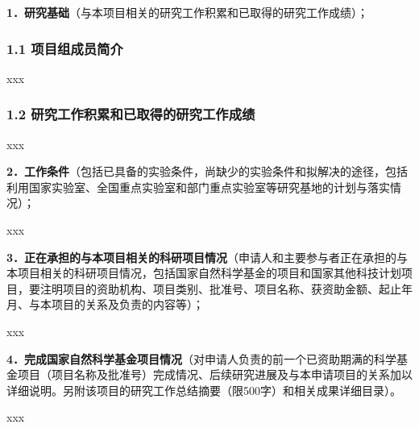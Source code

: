 
{\sihao \kaishu \color{MsBlue}
	\textbf{1．研究基础}（与本项目相关的研究工作积累和已取得的研究工作成绩）；
}


\subsubsection{1.1 项目组成员简介}

{\kaishu
	
	xxx
}

\vspace{0.3cm}

\subsubsection{1.2 研究工作积累和已取得的研究工作成绩}

\vspace{0.3cm}
{\kaishu
	xxx
}

{\sihao \kaishu \color{MsBlue}
	\textbf{2．工作条件}（包括已具备的实验条件，尚缺少的实验条件和拟解决的途径，包括利用国家实验室、全国重点实验室和部门重点实验室等研究基地的计划与落实情况）；
}

{\kaishu
	xxx
}


\vspace{0.3cm}

{\sihao \kaishu \color{MsBlue}
	\textbf{3．正在承担的与本项目相关的科研项目情况}（申请人和主要参与者正在承担的与本项目相关的科研项目情况，包括国家自然科学基金的项目和国家其他科技计划项目，要注明项目的资助机构、项目类别、批准号、项目名称、获资助金额、起止年月、与本项目的关系及负责的内容等）；
}

{\kaishu
	xxx
}

\vspace{0.3cm}

{\sihao \kaishu \color{MsBlue}
	\textbf{4．完成国家自然科学基金项目情况}（对申请人负责的前一个已资助期满的科学基金项目（项目名称及批准号）完成情况、后续研究进展及与本申请项目的关系加以详细说明。另附该项目的研究工作总结摘要（限500字）和相关成果详细目录）。
}

{\kaishu
	xxx
}